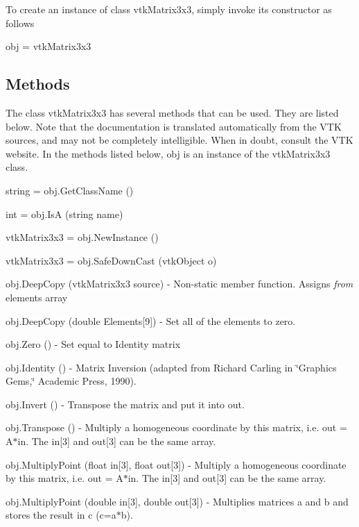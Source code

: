 To create an instance of class vtk\-Matrix3x3, simply invoke its constructor as follows \begin{DoxyVerb}  obj = vtkMatrix3x3
\end{DoxyVerb}
 \hypertarget{vtkwidgets_vtkxyplotwidget_Methods}{}\subsection{Methods}\label{vtkwidgets_vtkxyplotwidget_Methods}
The class vtk\-Matrix3x3 has several methods that can be used. They are listed below. Note that the documentation is translated automatically from the V\-T\-K sources, and may not be completely intelligible. When in doubt, consult the V\-T\-K website. In the methods listed below, {\ttfamily obj} is an instance of the vtk\-Matrix3x3 class. 
\begin{DoxyItemize}
\item {\ttfamily string = obj.\-Get\-Class\-Name ()}  
\item {\ttfamily int = obj.\-Is\-A (string name)}  
\item {\ttfamily vtk\-Matrix3x3 = obj.\-New\-Instance ()}  
\item {\ttfamily vtk\-Matrix3x3 = obj.\-Safe\-Down\-Cast (vtk\-Object o)}  
\item {\ttfamily obj.\-Deep\-Copy (vtk\-Matrix3x3 source)} -\/ Non-\/static member function. Assigns {\itshape from} elements array  
\item {\ttfamily obj.\-Deep\-Copy (double Elements\mbox{[}9\mbox{]})} -\/ Set all of the elements to zero.  
\item {\ttfamily obj.\-Zero ()} -\/ Set equal to Identity matrix  
\item {\ttfamily obj.\-Identity ()} -\/ Matrix Inversion (adapted from Richard Carling in \char`\"{}\-Graphics Gems,\char`\"{} Academic Press, 1990).  
\item {\ttfamily obj.\-Invert ()} -\/ Transpose the matrix and put it into out.  
\item {\ttfamily obj.\-Transpose ()} -\/ Multiply a homogeneous coordinate by this matrix, i.\-e. out = A$\ast$in. The in\mbox{[}3\mbox{]} and out\mbox{[}3\mbox{]} can be the same array.  
\item {\ttfamily obj.\-Multiply\-Point (float in\mbox{[}3\mbox{]}, float out\mbox{[}3\mbox{]})} -\/ Multiply a homogeneous coordinate by this matrix, i.\-e. out = A$\ast$in. The in\mbox{[}3\mbox{]} and out\mbox{[}3\mbox{]} can be the same array.  
\item {\ttfamily obj.\-Multiply\-Point (double in\mbox{[}3\mbox{]}, double out\mbox{[}3\mbox{]})} -\/ Multiplies matrices a and b and stores the result in c (c=a$\ast$b).  

\end{DoxyItemize}
